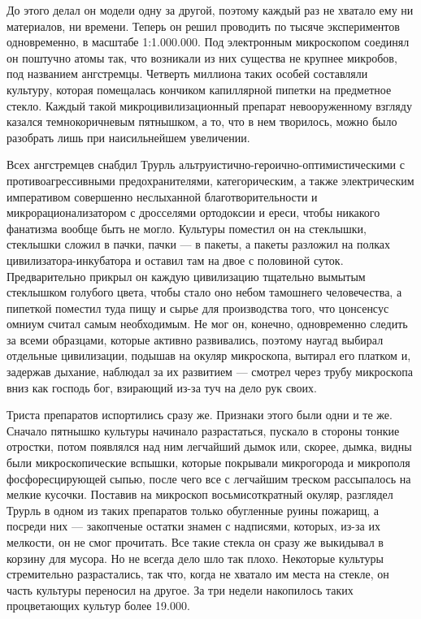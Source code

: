 До этого делал он модели одну за другой, поэтому каждый
раз не хватало ему ни материалов, ни времени. Теперь он
решил проводить по тысяче экспериментов одновременно, в
масштабе 1:1.000.000. Под электронным микроскопом соединял
он поштучно атомы так, что возникали из них существа не
крупнее микробов, под названием ангстремцы. Четверть
миллиона таких особей составляли культуру, которая
помещалась кончиком капиллярной пипетки на предметное
стекло. Каждый такой микроцивилизационный препарат
невооруженному взгляду казался темнокоричневым пятнышком, а
то, что в нем творилось, можно было разобрать лишь при
наисильнейшем увеличении.

Всех ангстремцев снабдил Трурль
альтруистично-героично-оптимистическими с
противоагрессивными предохранителями, категорическим, а
также электрическим императивом совершенно неслыханной
благотворительности и микрорационализатором с дросселями
ортодоксии и ереси, чтобы никакого фанатизма вообще быть не
могло. Культуры поместил он на стеклышки, стеклышки сложил в
пачки, пачки --- в пакеты, а пакеты разложил на полках
цивилизатора-инкубатора и оставил там на двое с половиной
суток. Предварительно прикрыл он каждую цивилизацию
тщательно вымытым стеклышком голубого цвета, чтобы стало оно
небом тамошнего человечества, а пипеткой поместил туда пищу
и сырье для производства того, что цонсенсус омниум считал
самым необходимым. Не мог он, конечно, одновременно следить
за всеми образцами, которые активно развивались, поэтому
наугад выбирал отдельные цивилизации, подышав на окуляр
микроскопа, вытирал его платком и, задержав дыхание,
наблюдал за их развитием --- смотрел через трубу микроскопа
вниз как господь бог, взирающий из-за туч на дело рук своих.

Триста препаратов испортились сразу же. Признаки этого
были одни и те же. Сначало пятнышко культуры начинало
разрастаться, пускало в стороны тонкие отростки, потом
появлялся над ним легчайший дымок или, скорее, дымка, видны
были микроскопические вспышки, которые покрывали микрогорода
и микрополя фосфоресцирующей сыпью, после чего все с
легчайшим треском рассыпалось на мелкие кусочки. Поставив на
микроскоп восьмисоткратный окуляр, разглядел Трурль в одном
из таких препаратов только обугленные руины пожарищ, а
посреди них --- закопченые остатки знамен с надписями,
которых, из-за их мелкости, он не смог прочитать. Все такие
стекла он сразу же выкидывал в корзину для мусора. Но не
всегда дело шло так плохо. Некоторые культуры стремительно
разрастались, так что, когда не хватало им места на стекле,
он часть культуры переносил на другое. За три недели
накопилось таких процветающих культур более 19.000.

